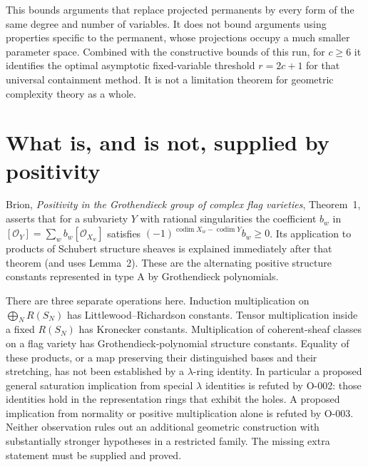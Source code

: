This bounds arguments that replace projected permanents by every
form of the same degree and number of variables. It does not bound
arguments using properties specific to the permanent, whose
projections occupy a much smaller parameter space. Combined with
the constructive bounds of this run, for $c\geq6$ it identifies
the optimal asymptotic fixed-variable threshold $r=2c+1$ for that
universal containment method. It is not a limitation theorem for
geometric complexity theory as a whole.
















\section{What is, and is not, supplied by positivity}

Brion, \emph{Positivity in the Grothendieck group of complex flag
varieties}, Theorem~1, asserts that for a subvariety $Y$ with rational
singularities the coefficient $b_w$ in
$[\mathcal O_Y]=\sum_w b_w[\mathcal O_{X_w}]$ satisfies
$(-1)^{\operatorname{codim}X_w-\operatorname{codim}Y}b_w\geq0$.
Its application to products of Schubert structure sheaves is explained
immediately after that theorem (and uses Lemma~2). These are the
alternating positive structure constants represented in type A by
Grothendieck polynomials.

There are three separate operations here. Induction multiplication on
$\bigoplus_N R(S_N)$ has Littlewood--Richardson constants. Tensor
multiplication inside a fixed $R(S_N)$ has Kronecker constants.
Multiplication of coherent-sheaf classes on a flag variety has
Grothendieck-polynomial structure constants. Equality of these
products, or a map preserving their distinguished bases and their
stretching, has not been established by a $\lambda$-ring identity.
In particular a proposed general saturation implication from special
$\lambda$ identities is refuted by O-002: those identities hold in
the representation rings that exhibit the holes.  A proposed
implication from normality or positive multiplication alone is refuted
by O-003. Neither observation rules out an additional geometric
construction with substantially stronger hypotheses in a restricted
family. The missing extra statement must be supplied and proved.

